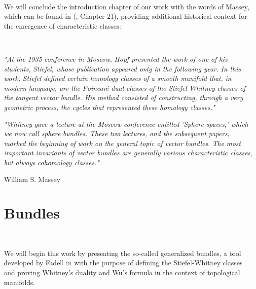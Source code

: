 \documentclass[12pt,oneside]{book}
\begin{document}
    \
    
    We will conclude the introduction chapter of our work with the words of Massey, which can be found 
    in (\cite{james}, Chapter 21), providing additional historical context for the emergence of 
    characteristic classes:

    \

    \begin{center}
        \begin{minipage}{12cm}
            \textit{"At the 1935 conference in Moscow, Hopf presented the work of one of his students, 
            Stiefel, whose publication appeared only in the following year. In this work, Stiefel 
            defined certain homology classes of a smooth manifold that, in modern language, are the 
            Poincaré-dual classes of the Stiefel-Whitney classes of the tangent vector bundle. His 
            method consisted of constructing, through a very geometric process, the cycles that 
            represented these homology classes."}
        \end{minipage}
    \end{center}

    \vspace{0.5cm}

    \begin{center}
        \begin{minipage}{12cm}
            \textit{"Whitney gave a lecture at the Moscow conference entitled 'Sphere spaces,' which we 
            now call sphere bundles. These two lectures, and the subsequent papers, marked the beginning 
            of work on the general topic of vector bundles. The most important invariants of vector 
            bundles are generally various characteristic classes, but always cohomology classes."}
            \begin{flushright}
                William S. Massey
            \end{flushright}
        \end{minipage}
    \end{center}

    



    \chapter{Bundles}\label{cap_fib}
    \thispagestyle{empty}

    \

    We will begin this work by presenting the so-called generalized bundles, a 
    tool developed by Fadell in \cite{fadell_1} with the purpose of defining the Stiefel-Whitney 
    classes and proving Whitney's duality and Wu's 
    formula in the context of topological manifolds.
\end{document}
